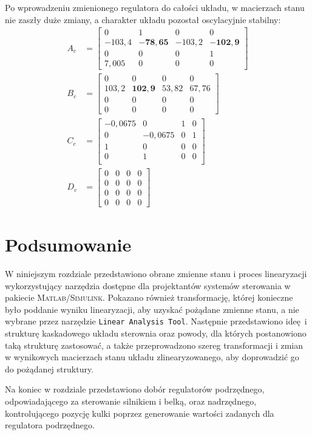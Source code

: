 Po wprowadzeniu zmienionego regulatora do całości układu, w macierzach stanu nie zaszły duże zmiany, a charakter układu pozostał oscylacyjnie stabilny:
\begin{align}
    A_c &= \begin{bmatrix}
        0 & 1 & 0 & 0 \\
        -103,4 & \mathbf{-78,65} & -103,2 & \mathbf{-102,9} \\
        0 & 0 & 0 & 1 \\
        7,005 & 0 & 0 & 0
    \end{bmatrix} \nonumber \\
    B_c &= \begin{bmatrix}
        0 & 0 & 0 & 0 \\
        103,2 & \mathbf{102,9} & 53,82 & 67,76 \\
        0 & 0 & 0 & 0 \\
        0 & 0 & 0 & 0
    \end{bmatrix} \nonumber \\
    C_c &= \begin{bmatrix}
        -0,0675 & 0 & 1 & 0 \\
        0 & -0,0675 & 0 & 1 \\
        1 & 0 & 0 & 0 \\
        0 & 1 & 0 & 0 \\
    \end{bmatrix} \nonumber \\
    D_c &= \begin{bmatrix}
        0 & 0 & 0 & 0 \\
        0 & 0 & 0 & 0 \\
        0 & 0 & 0 & 0 \\
        0 & 0 & 0 & 0
    \end{bmatrix} \label{eq:macierze_stanu_calego_ukladu2}
\end{align}

\section{Podsumowanie}

W niniejszym rozdziale przedstawiono obrane zmienne stanu i proces linearyzacji wykorzystujący narzędzia dostępne dla projektantów systemów sterowania w pakiecie \textsc{Matlab/Simulink}. Pokazano również transformację, której konieczne było poddanie wyniku linearyzacji, aby uzyskać pożądane zmienne stanu, a nie wybrane przez narzędzie \texttt{Linear Analysis Tool}. Następnie przedstawiono ideę i strukturę kaskadowego układu sterownia oraz powody, dla których postanowiono taką strukturę zastosować, a także przeprowadzono szereg transformacji i zmian w wynikowych macierzach stanu układu zlinearyzowanego, aby doprowadzić go do pożądanej struktury.

Na koniec w rozdziale przedstawiono dobór regulatorów podrzędnego, odpowiadającego za sterowanie silnikiem i belką, oraz nadrzędnego, kontrolującego pozycję kulki poprzez generowanie wartości zadanych dla regulatora podrzędnego.

